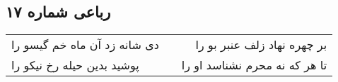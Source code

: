 \begin{center}
\section*{رباعی شماره ۱۷}
\label{sec:sh017}
\begin{longtable}{l p{0.5cm} r}
دی شانه زد آن ماه خم گیسو را
&&
بر چهره نهاد زلف عنبر بو را
\\
پوشید بدین حیله رخ نیکو را
&&
تا هر که نه محرم نشناسد او را
\\
\end{longtable}
\end{center}
